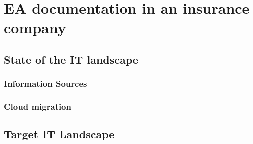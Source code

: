 

\chapter{EA documentation in an insurance company}\label{chapter:EA documentation in an insurance company} 

\section{State of the IT landscape}

\subsection{Information Sources}

\subsection{Cloud migration}

\section{Target IT Landscape}











